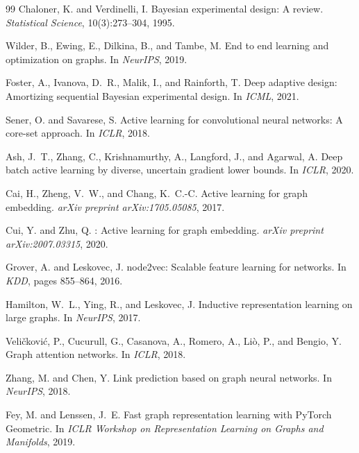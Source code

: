 \documentclass[12pt,a4paper,oneside]{report}
\begin{document}
\begin{thebibliography}{99}
Chaloner, K. and Verdinelli, I.
\newblock Bayesian experimental design: A review.
\newblock \emph{Statistical Science}, 10(3):273--304, 1995.

Wilder, B., Ewing, E., Dilkina, B., and Tambe, M.
\newblock End to end learning and optimization on graphs.
\newblock In \emph{NeurIPS}, 2019.

Foster, A., Ivanova, D.~R., Malik, I., and Rainforth, T.
\newblock Deep adaptive design: Amortizing sequential {B}ayesian experimental design.
\newblock In \emph{ICML}, 2021.

Sener, O. and Savarese, S.
\newblock Active learning for convolutional neural networks: A core-set approach.
\newblock In \emph{ICLR}, 2018.

Ash, J.~T., Zhang, C., Krishnamurthy, A., Langford, J., and Agarwal, A.
\newblock Deep batch active learning by diverse, uncertain gradient lower bounds.
\newblock In \emph{ICLR}, 2020.

Cai, H., Zheng, V.~W., and Chang, K.~C.-C.
\newblock Active learning for graph embedding.
\newblock \emph{arXiv preprint arXiv:1705.05085}, 2017.

Cui, Y. and Zhu, Q.
: Active learning for graph embedding.
\newblock \emph{arXiv preprint arXiv:2007.03315}, 2020.

Grover, A. and Leskovec, J.
\newblock node2vec: Scalable feature learning for networks.
\newblock In \emph{KDD}, pages 855--864, 2016.

Hamilton, W.~L., Ying, R., and Leskovec, J.
\newblock Inductive representation learning on large graphs.
\newblock In \emph{NeurIPS}, 2017.

Veli\v{c}kovi\'{c}, P., Cucurull, G., Casanova, A., Romero, A., Li\`{o}, P., and Bengio, Y.
\newblock Graph attention networks.
\newblock In \emph{ICLR}, 2018.

Zhang, M. and Chen, Y.
\newblock Link prediction based on graph neural networks.
\newblock In \emph{NeurIPS}, 2018.

Fey, M. and Lenssen, J.~E.
\newblock Fast graph representation learning with {PyTorch Geometric}.
\newblock In \emph{ICLR Workshop on Representation Learning on Graphs and Manifolds}, 2019.


\end{thebibliography}
\end{document}
